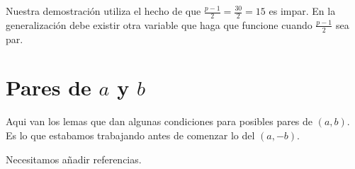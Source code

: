\documentclass[12pt]{article}
\begin{document}
Nuestra demostraci\'on utiliza el hecho de que $\frac{p-1}{2} = \frac{30}{2}=15$ es impar. En la generalizaci\'on debe existir otra variable que haga que funcione cuando $\frac{p-1}{2}$ sea par. 


\section{Pares de $a$ y $b$}

Aqui van los lemas que dan algunas condiciones para posibles pares de $(a,b)$. Es lo que estabamos trabajando antes de comenzar lo del $(a,-b)$.


\begin{thebibliography}{}

Necesitamos a\~nadir referencias.

\end{thebibliography}
\end{document}
